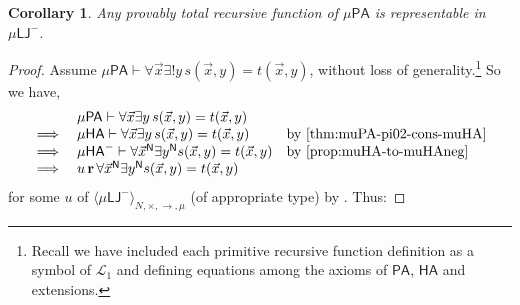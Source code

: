 \documentclass[10pt,a4paper]{amsart}
\theoremstyle{plain}
\newtheorem{corollary}[corollary]{Corollary}
\theoremstyle{definition}
\theoremstyle{plain}
\theoremstyle{definition} %
\newcommand{\numeral}[1]{\underline{#1}}
\newcommand{\Nat}{\mathbb{N}}
\newcommand{\closure}[1]{\langle #1 \rangle}
\newcommand{\clomuLJneg}{\closure{\muLJneg}}
\newcommand{\typedclomuLJneg}{\clomuLJneg_{\N,\times,\arrow,\mu}}
\newcommand{\nat}{\mathit{N}}
\newcommand{\N}{\nat} %
\newcommand{\arrow}{\to}
\newcommand{\LJ}{\mathsf{LJ}}
\newcommand{\muLJ}{\mu\LJ}
\newcommand{\muLJneg}{\muLJ^-}
\newcommand{\limp}{\to}
\newcommand{\Lang}{\mathcal L}
\newcommand{\lang}[1]{\Lang_{#1}}
\newcommand{\langarith}{\lang 1}
\newcommand{\proves}{\vdash}
\newcommand{\PA}{\mathsf{PA}}
\newcommand{\HA}{\mathsf{HA}}
\newcommand{\muPA}{\mu\PA}
\newcommand{\muHA}{\mu\HA}
\newcommand{\realises}{\mathbf{r}}
\newcommand{\pNat}{\mathsf{N}}
\newcommand{\muHAneg}{\muHA^-}
\begin{document}
\begin{corollary}
    Any provably total recursive function of $\muPA$ is representable in $\muLJneg$.
\end{corollary}
\begin{proof}
    Assume $\muPA \proves \forall \vec x \exists ! y \, s(\vec x, y) = t(\vec x, y)$, without loss of generality.\footnote{Recall we have included each primitive recursive function definition as a symbol of $\langarith$ and defining equations among the axioms of $\PA$, $\HA$ and extensions.} 
    So we have,
    \[
    \begin{array}{rll}
          & \muPA \proves \forall \vec x \exists  y \, s(\vec x,y) = t(\vec x,y) \\
          \implies & \muHA \proves \forall \vec x \exists  y \, s(\vec x,y) = t(\vec x,y) & \text{by \Cref{thm:muPA-pi02-cons-muHA}} \\
           \implies  & \muHAneg \proves \forall \vec x^\pNat \exists y^\pNat s(\vec x,y) = t(\vec x,y) & \text{by \Cref{prop:muHA-to-muHAneg}} \\
          \implies  &  u\, \realises\,  \forall \vec x^\pNat \exists y^\pNat s(\vec x,y) = t(\vec x,y) 
        \end{array}
          \]
          for some $u$ of $ \typedclomuLJneg$ (of appropriate type) by .
                    Thus:

\end{proof}
\end{document}
